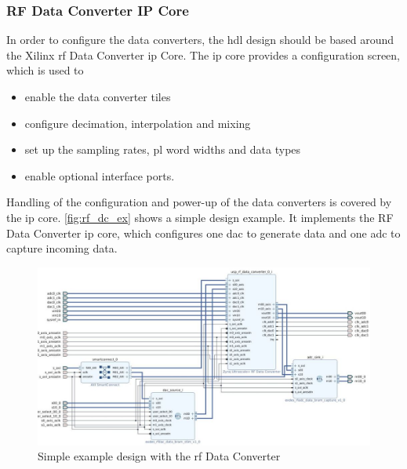 \subsubsection*{RF Data Converter IP Core}
In order to configure the data converters, the \gls{hdl} design should be based around the Xilinx \gls{rf} Data Converter \gls{ip} Core. 
The \gls{ip} core provides a configuration screen, which is used to 
\begin{itemize}
	\item enable the data converter tiles
	\item configure decimation, interpolation and mixing 
	\item set up the sampling rates, \gls{pl} word widths and data types
	\item enable optional interface ports.
\end{itemize}
Handling of the configuration and power-up of the data converters is covered by the \gls{ip} core. 
\autoref{fig:rf_dc_ex} shows a simple design example. It implements the RF Data Converter \gls{ip} core, which configures one \gls{dac} to generate data and one \gls{adc} to capture incoming data.
\begin{figure}[tb]
	\centering
	\includegraphics[width = \textwidth]{chap/05-readout/img/rf_data_converter}
	\caption{Simple example design with the \gls{rf} Data Converter}
	\label{fig:rf_dc_ex}
\end{figure}

